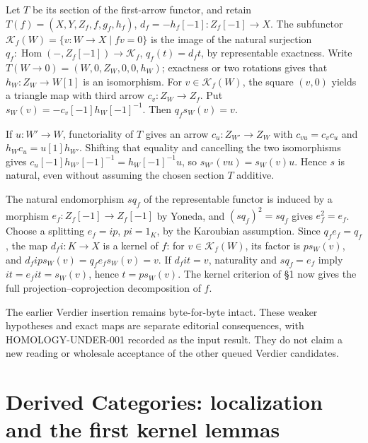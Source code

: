 \documentclass[11pt]{article}
\begin{document}
Let \(T\) be its section of the first-arrow functor,\allowbreak{} and retain \(T(f)=(X,Y,Z_f,f,g_f,h_f)\),\allowbreak{} \(d_f=-h_f[-1]:Z_f[-1]\to X\). The subfunctor \(\mathcal K_f(W)=\{v:W\to X\mid fv=0\}\) is the image of the natural surjection \(q_f:\operatorname{Hom}(-,Z_f[-1])\to\mathcal K_f\),\allowbreak{} \(q_f(t)=d_ft\),\allowbreak{} by representable exactness. Write \(T(W\to0)=(W,0,Z_W,0,0,h_W)\); exactness or two rotations gives that \(h_W:Z_W\to W[1]\) is an isomorphism. For \(v\in\mathcal K_f(W)\),\allowbreak{} the square \((v,0)\) yields a triangle map with third arrow \(c_v:Z_W\to Z_f\). Put \(s_W(v)=-c_v[-1]h_W[-1]^{-1}\). Then \(q_fs_W(v)=v\).

If \(u:W'\to W\),\allowbreak{} functoriality of \(T\) gives an arrow \(c_u:Z_{W'}\to Z_W\) with \(c_{vu}=c_vc_u\) and \(h_Wc_u=u[1]h_{W'}\). Shifting that equality and cancelling the two isomorphisms gives \(c_u[-1]h_{W'}[-1]^{-1}=h_W[-1]^{-1}u\),\allowbreak{} so \(s_{W'}(vu)=s_W(v)u\). Hence \(s\) is natural,\allowbreak{} even without assuming the chosen section \(T\) additive.

The natural endomorphism \(sq_f\) of the representable functor is induced by a morphism \(e_f:Z_f[-1]\to Z_f[-1]\) by Yoneda,\allowbreak{} and \((sq_f)^2=sq_f\) gives \(e_f^2=e_f\). Choose a splitting \(e_f=ip\),\allowbreak{} \(pi=1_K\),\allowbreak{} by the Karoubian assumption. Since \(q_fe_f=q_f\),\allowbreak{} the map \(d_fi:K\to X\) is a kernel of \(f\):\allowbreak{} for \(v\in\mathcal K_f(W)\),\allowbreak{} its factor is \(p s_W(v)\),\allowbreak{} and \(d_fip s_W(v)=q_fe_fs_W(v)=v\). If \(d_fit=v\),\allowbreak{} naturality and \(sq_f=e_f\) imply \(it=e_f it=s_W(v)\),\allowbreak{} hence \(t=p s_W(v)\). The kernel criterion of §1 now gives the full projection–\allowbreak{}coprojection decomposition of \(f\).

The earlier Verdier insertion remains byte-for-byte intact. These weaker hypotheses and exact maps are separate editorial consequences,\allowbreak{} with HOMOLOGY-UNDER-001 recorded as the input result. They do not claim a new reading or wholesale acceptance of the other queued Verdier candidates.
\clearpage
\section{\texorpdfstring{Derived Categories:\allowbreak{} localization and the first kernel lemmas}{Derived  localization and the first kernel lemmas}}\label{proofs-1149-1843-derived-categories-localization-and-the-first-kernel-lemmas}
\end{document}

